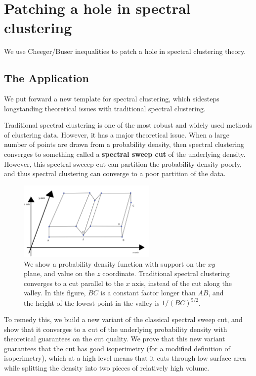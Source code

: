 \section{Patching a hole in spectral clustering}
We use Cheeger/Buser inequalities to patch a hole in spectral
clustering theory.
\subsection{The Application}
We put forward a new template for spectral clustering, which sidesteps
longstanding theoretical issues with traditional spectral clustering.

Traditional spectral clustering is one of the most robust and widely
used methods of clustering data. However, it has a major theoretical
issue. When a large number of points are drawn from a probability
density, then spectral clustering converges to something called a
\textbf{spectral sweep cut} of the underlying density.  However, this
spectral sweeep cut can partition the probability density poorly, and
thus spectral clustering can converge to a poor partition of the data.

\begin{figure}[htbp]
\centering
\includegraphics[width=0.6\textwidth]{images/counterexample.png}
\caption{
  We show a probability density function with support on the $xy$ plane,
  and value on the $z$ coordinate.  Traditional spectral clustering converges to a cut
  parallel to the $x$ axis, instead of the cut along the valley.
    In this figure,
  $BC$ is a constant
  factor longer than $AB$, and the height of the lowest point in the
  valley is
  $1/(BC)^{5/2}$. 
 }
\label{fig:spec}
\end{figure}

To remedy this, we build a new variant of the classical spectral sweep
cut, and show that it converges to a cut of the underlying probability
density with theoretical guarantees on the cut quality. We prove that
this new variant guarantees that the cut has good isoperimetry (for a
    modified definition of isoperimetry), which at a high level means
that it cuts through low surface area while splitting the density into
two pieces of relatively high volume.

